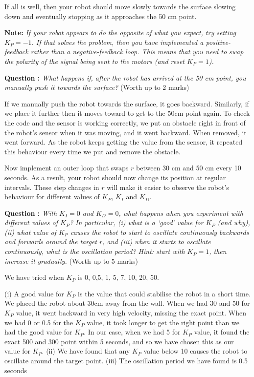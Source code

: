 \documentclass[hidelinks,a4paper,11pt]{article}
\newcounter{question}
\newcommand\myq{\refstepcounter{question}\thequestion}
\begin{document}
If all is well, then your robot should move slowly towards the surface slowing down and eventually stopping as it approaches the 50 cm point.

{\bfseries Note:}  \emph{If your robot appears to do the opposite of what you expect, try setting $K_P=-1$.  If that solves the problem, then you have implemented a positive-feedback rather than a negative-feedback loop.  This means that you need to swap the polarity of the signal being sent to the motors (and reset $K_P=1$).}

{\bfseries Question \myq:}  \emph{What happens if, after the robot has arrived at the 50 cm point, you manually push it towards the surface?} (Worth up to 2 marks)\\
\begin{mdframed}
If we manually push the robot towards the surface, it goes backward. Similarly, if we place it further then it moves toward to get to the 50cm point again. To check the code and the sensor is working correctly, we put an obstacle right in front of the robot’s sensor when it was moving, and it went backward. When removed, it went forward. As the robot keeps getting the value from the sensor, it repeated this behaviour every time we put and remove the obstacle.
\end{mdframed}
\vspace*{\baselineskip}

Now implement an outer loop that swaps $r$ between 30 cm and 50 cm every 10 seconds.  As a result, your robot should now change its position at regular intervals.  These step changes in $r$ will make it easier to observe the robot's behaviour for different values of $K_P$, $K_I$ and $K_D$.

{\bfseries Question \myq:}  \emph{With $K_I=0$ and $K_D=0$, what happens when you experiment with different values of $K_P$?  In particular, (i) what is a `good' value for $K_P$ (and why), (ii) what value of $K_P$ causes the robot to start to oscillate continuously backwards and forwards around the target $r$, and (iii) when it starts to oscillate continuously, what is the oscillation period?  Hint: start with $K_P =1$, then increase it gradually.} (Worth up to 5 marks)\\
\begin{mdframed}
We have tried when $K_P$ is 0, 0,5, 1, 5, 7, 10, 20, 50.

(i) A good value for $K_P$ is the value that could stabilise the robot in a short time. We placed the robot about 30cm away from the wall. When we had 30 and 50 for $K_P$ value, it went backward in very high velocity, missing the exact point. When we had 0 or 0.5 for the $K_P$ value, it took longer to get the right point than we had the good value for $K_P$. In our case, when we had 5 for $K_P$ value, it found the exact 500 and 300 point within 5 seconds, and so we have chosen this as our value for $K_P$.
(ii) We have found that any  $K_P$  value below 10 causes the robot to oscillate around the target point.
(iii) The oscillation period we have found is 0.5 seconds
\end{mdframed}
\vspace*{\baselineskip}
\end{document}
